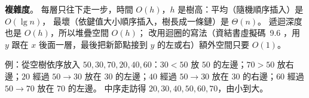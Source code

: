 \begin{pastsoln}
\textbf{複雜度}。 每層只往下走一步，時間 $O(h)$，$h$ 是樹高：平均（隨機順序插入）是 $O(\lg n)$，
最壞（依鍵值大小順序插入，樹長成一條鏈）是 $\Theta(n)$。 遞迴深度也是 $O(h)$，所以堆疊空間 $O(h)$；
改用迴圈的寫法（資結書虛擬碼~9.6 ，用 $y$ 跟在 $x$ 後面一層，最後把新節點接到 $y$
的左或右）額外空間只要 $O(1)$。

例：從空樹依序放入 $50, 30, 70, 20, 40, 60$：$30 < 50$ 放 $50$ 的左邊；$70 > 50$ 放右邊；$20$ 經過
$50 \to 30$ 放在 $30$ 的左邊；$40$ 經過 $50 \to 30$ 放在 $30$ 的右邊；$60$ 經過 $50 \to 70$ 放在 $70$
的左邊。 中序走訪得 $20, 30, 40, 50, 60, 70$，由小到大。
\end{pastsoln}
